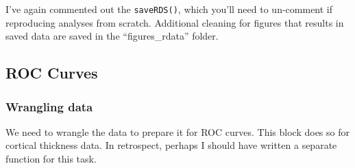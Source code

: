 \documentclass[
]{article}
\begin{document}
I've again commented out the \texttt{saveRDS()}, which you'll need to
un-comment if reproducing analyses from scratch. Additional cleaning for
figures that results in saved data are saved in the ``figures\_rdata''
folder.

\hypertarget{roc-curves}{%
\subsection{ROC Curves}\label{roc-curves}}

\hypertarget{wrangling-data}{%
\subsubsection{Wrangling data}\label{wrangling-data}}

We need to wrangle the data to prepare it for ROC curves. This block
does so for cortical thickness data. In retrospect, perhaps I should
have written a separate function for this task.
\end{document}
